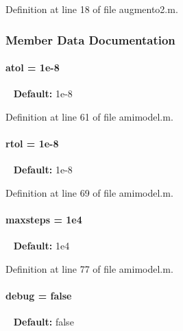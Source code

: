 Definition at line 18 of file augmento2.\+m.



\subsubsection{Member Data Documentation}
\hypertarget{classamimodel_a0c5f3dcf809a17b895fe12fc91272349}{}
\paragraph[{atol}]{\setlength{\rightskip}{0pt plus 5cm}atol = 1e-\/8}\label{classamimodel_a0c5f3dcf809a17b895fe12fc91272349}
~\newline
{\bfseries Default\+:} 1e-\/8 

Definition at line 61 of file amimodel.\+m.

\hypertarget{classamimodel_a7978e9a4674f869e6b2950e2f6262ca5}{}
\paragraph[{rtol}]{\setlength{\rightskip}{0pt plus 5cm}rtol = 1e-\/8}\label{classamimodel_a7978e9a4674f869e6b2950e2f6262ca5}
~\newline
{\bfseries Default\+:} 1e-\/8 

Definition at line 69 of file amimodel.\+m.

\hypertarget{classamimodel_ac37622882dacee1f11688d4941ccb45e}{}
\paragraph[{maxsteps}]{\setlength{\rightskip}{0pt plus 5cm}maxsteps = 1e4}\label{classamimodel_ac37622882dacee1f11688d4941ccb45e}
~\newline
{\bfseries Default\+:} 1e4 

Definition at line 77 of file amimodel.\+m.

\hypertarget{classamimodel_a0514aabed091ee5e2f35766eb01eced6}{}
\paragraph[{debug}]{\setlength{\rightskip}{0pt plus 5cm}debug = false}\label{classamimodel_a0514aabed091ee5e2f35766eb01eced6}
~\newline
{\bfseries Default\+:} false 

